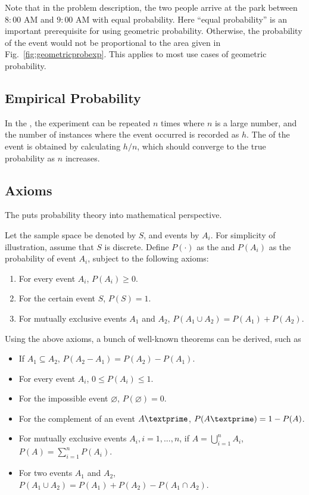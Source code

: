 Note that in the problem description, the two people arrive at the park between $8:00$ AM and $9:00$ AM with equal probability. Here ``equal probability'' is an important prerequisite for using geometric probability. Otherwise, the probability of the event would not be proportional to the area given in Fig.~\ref{fig:geometricprobexp}. This applies to most use cases of geometric probability.

\subsection{Empirical Probability}

In the , the experiment can be repeated $n$ times where $n$ is a large number, and the number of instances where the event occurred is recorded as $h$. The  of the event is obtained by calculating $h/n$, which should converge to the true probability as $n$ increases.

\subsection{Axioms} \label{subsec:probability_axioms}

The  puts probability theory into mathematical perspective. 

Let the sample space be denoted by $S$, and events by $A_i$. For simplicity of illustration, assume that $S$ is discrete. Define $P(\cdot)$ as the  and $P(A_i)$ as the probability of event $A_i$, subject to the following axioms:
\begin{enumerate}
  \item For every event $A_i$, $P(A_i)\geq 0$.
  \item For the certain event $S$, $P(S)=1$.
  \item For mutually exclusive events $A_1$ and $A_2$, $P\left(A_1\cup A_2\right) = P(A_1)+P(A_2)$.
\end{enumerate}

Using the above axioms, a bunch of well-known theorems can be derived, such as
\begin{itemize}
  \item If $A_1 \subseteq A_2$, $P(A_2-A_1) = P(A_2)-P(A_1)$.
  \item For every event $A_i$, $0\leq P(A_i) \leq 1$.
  \item For the impossible event $\varnothing$, $P(\varnothing)=0$.
  \item For the complement of an event $A\textprime$, $P(A\textprime)=1-P(A)$.
  \item For mutually exclusive events $A_i, i=1,...,n$, if $A = \bigcup_{i=1}^{n} A_i$, $P(A) = \sum_{i=1}^{n}P(A_i)$.
  \item For two events $A_1$ and $A_2$, $P\left(A_1\cup A_2\right) = P(A_1)+P(A_2)-P\left(A_1\cap A_2\right)$.
\end{itemize}

